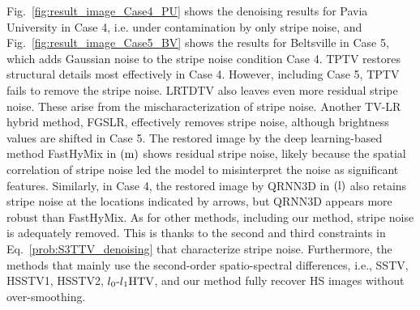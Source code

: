 

Fig.~\ref{fig:result_image_Case4_PU} shows the denoising results for Pavia University in Case 4, i.e. under contamination by only stripe noise, and Fig.~\ref{fig:result_image_Case5_BV} shows the results for Beltsville in Case 5, which adds Gaussian noise to the stripe noise condition Case 4.
TPTV restores structural details most effectively in Case 4. However, including Case 5, TPTV fails to remove the stripe noise. LRTDTV also leaves even more residual stripe noise. These arise from the mischaracterization of stripe noise. Another TV-LR hybrid method, FGSLR, effectively removes stripe noise, although brightness values are shifted in Case 5. The restored image by the deep learning-based method FastHyMix in $\text{(m)}$ shows residual stripe noise, likely because the spatial correlation of stripe noise led the model to misinterpret the noise as significant features. Similarly, in Case 4, the restored image by QRNN3D in $\text{(l)}$ also retains stripe noise at the locations indicated by arrows, but QRNN3D appears more robust than FastHyMix. As for other methods, including our method, stripe noise is adequately removed. This is thanks to the second and third constraints in Eq.~\eqref{prob:S3TTV_denoising} that characterize stripe noise. Furthermore, the methods that mainly use the second-order spatio-spectral differences, i.e., SSTV, HSSTV1, HSSTV2, ${l_{0}\text{-}l_{1}\text{HTV}}$, and our method fully recover HS images without over-smoothing.


